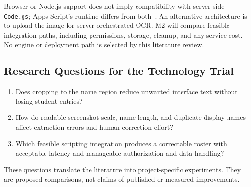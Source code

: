 Browser or Node.js support does not imply compatibility with server-side
\texttt{Code.gs}; Apps Script's runtime differs from both~\cite{googleAppsScriptV8}.
An alternative architecture is to upload the image for server-orchestrated OCR.
M2 will compare feasible integration paths, including permissions, storage,
cleanup, and any service cost. No engine or deployment path is selected by this
literature review.

\subsection{Research Questions for the Technology Trial}
\begin{enumerate}
\item Does cropping to the name region reduce unwanted interface text without
losing student entries?
\item How do readable screenshot scale, name length, and duplicate display names
affect extraction errors and human correction effort?
\item Which feasible scripting integration produces a correctable roster with
acceptable latency and manageable authorization and data handling?
\end{enumerate}
These questions translate the literature into project-specific experiments.
They are proposed comparisons, not claims of published or measured improvements.
